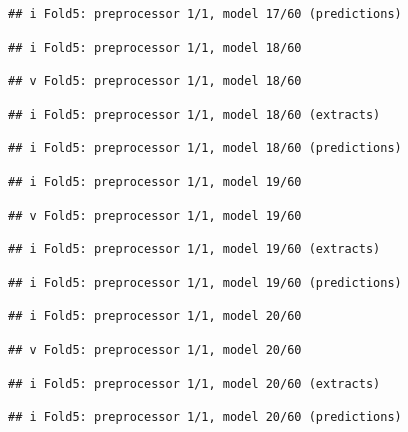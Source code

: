 \documentclass[
]{article}
\begin{document}
\begin{verbatim}
## i Fold5: preprocessor 1/1, model 17/60 (predictions)
\end{verbatim}

\begin{verbatim}
## i Fold5: preprocessor 1/1, model 18/60
\end{verbatim}

\begin{verbatim}
## v Fold5: preprocessor 1/1, model 18/60
\end{verbatim}

\begin{verbatim}
## i Fold5: preprocessor 1/1, model 18/60 (extracts)
\end{verbatim}

\begin{verbatim}
## i Fold5: preprocessor 1/1, model 18/60 (predictions)
\end{verbatim}

\begin{verbatim}
## i Fold5: preprocessor 1/1, model 19/60
\end{verbatim}

\begin{verbatim}
## v Fold5: preprocessor 1/1, model 19/60
\end{verbatim}

\begin{verbatim}
## i Fold5: preprocessor 1/1, model 19/60 (extracts)
\end{verbatim}

\begin{verbatim}
## i Fold5: preprocessor 1/1, model 19/60 (predictions)
\end{verbatim}

\begin{verbatim}
## i Fold5: preprocessor 1/1, model 20/60
\end{verbatim}

\begin{verbatim}
## v Fold5: preprocessor 1/1, model 20/60
\end{verbatim}

\begin{verbatim}
## i Fold5: preprocessor 1/1, model 20/60 (extracts)
\end{verbatim}

\begin{verbatim}
## i Fold5: preprocessor 1/1, model 20/60 (predictions)
\end{verbatim}
\end{document}
